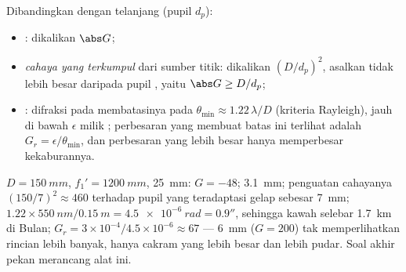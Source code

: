 \begin{proposition}\label{prop:b1:optical-instruments:gains}
Dibandingkan dengan  telanjang (pupil $d_p$):
\begin{itemize}
  \item \emph{}: dikalikan $\abs G$;
  \item \emph{cahaya yang terkumpul} dari sumber titik: dikalikan
        $(D/d_p)^2$, asalkan  tidak lebih besar daripada
        pupil , yaitu $\abs G \geq D/d_p$;
  \item \emph{}: difraksi pada  membatasinya
        pada $\theta_{\min} \approx 1.22\,\lambda/D$ (kriteria
        Rayleigh), jauh di bawah $\epsilon$ milik ; perbesaran yang
        membuat batas ini terlihat adalah $G_r = \epsilon/\theta_{\min}$,
        dan perbesaran yang lebih besar hanya memperbesar kekaburannya.
\end{itemize}
\end{proposition}
\admitted

\begin{example}\label{ex:b1:optical-instruments:telnum}
$D = \qty{150}{mm}$, $f_1' = \qty{1200}{mm}$,  \qty{25}{mm}:
$G = -48$;  \qty{3.1}{mm}; penguatan cahayanya $(150/7)^2 \approx
460$ terhadap pupil yang teradaptasi gelap sebesar \qty{7}{mm};  $1.22 \times
\qty{550}{nm}/\qty{0.15}{m} = \qty{4.5e-6}{rad} = 0.9''$, sehingga kawah
selebar \qty{1.7}{km} di Bulan; $G_r = 3\times10^{-4}/4.5\times
10^{-6} \approx 67$ ---  \qty{6}{mm} ($G = 200$) tak
memperlihatkan rincian lebih banyak, hanya cakram yang lebih besar dan
lebih pudar. Soal akhir pekan merancang alat ini.
\end{example}

